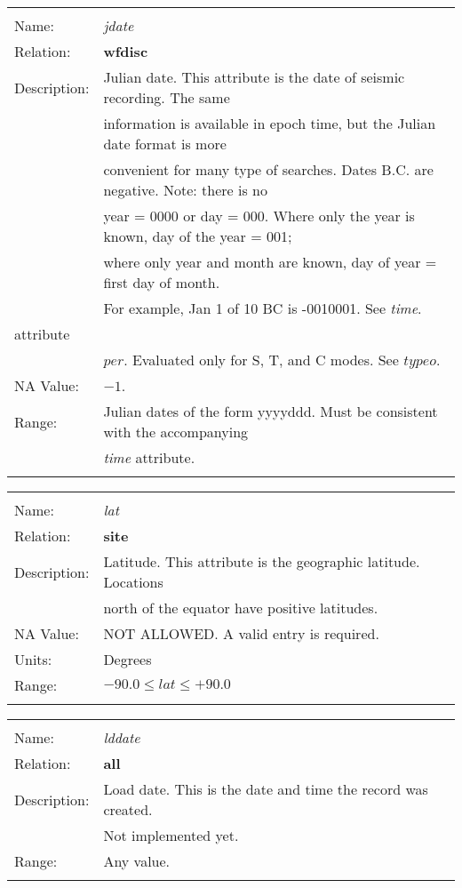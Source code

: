 \begin{tabular*}{6.5 in}{ll} \hline
\\
Name: & {\it jdate} \\
Relation: & {\bf wfdisc} \\
Description: & Julian date. This attribute is the date of seismic recording. The same \\
& information is available in epoch time, but the Julian date format is more \\
& convenient for many type of searches. Dates B.C. are negative. Note: there is no \\
& year = 0000 or day = 000. Where only the year is known, day of the year = 001; \\
& where only year and month are known, day of year = first day of month. \\
& For example, Jan 1 of 10 BC is -0010001. See {\it time}. \\
attribute \\
& $per$. Evaluated only for S, T, and C modes. See $typeo$. \\
NA Value: & $-1$. \\
Range: & Julian dates of the form yyyyddd. Must be consistent with the accompanying \\
& {\it time} attribute. \\
&\\
\end{tabular*}
\begin{tabular*}{6.5 in}{ll} \hline
\\
Name: & {\it lat} \\
Relation: & {\bf site} \\
Description: & Latitude. This attribute is the geographic latitude. Locations \\
& north of the equator have positive latitudes. \\
NA Value: & NOT ALLOWED. A valid entry is required. \\
Units: & Degrees \\
Range: & $-90.0 \leq lat \leq +90.0$ \\
&\\
\end{tabular*}
\begin{tabular*}{6.5 in}{ll} \hline
\\
Name: & {\it lddate} \\
Relation: & {\bf all} \\
Description: & Load date. This is the date and time the record was created. \\
& Not implemented yet. \\
Range: & Any value. \\
&\\
\end{tabular*}
